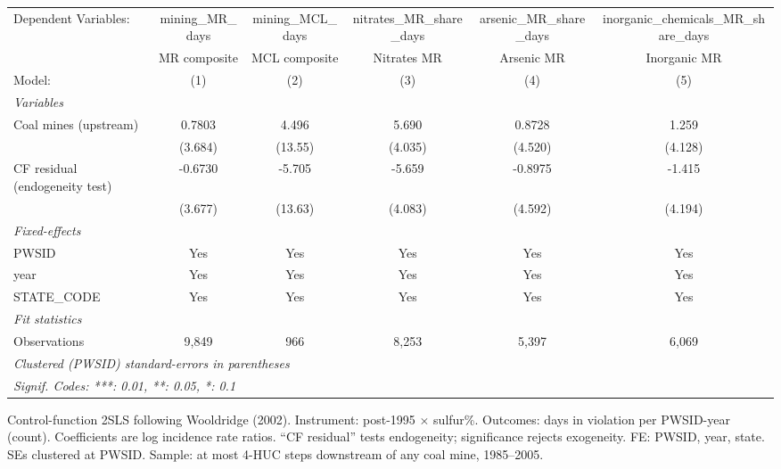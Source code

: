 
\begingroup
\centering
\begin{tabular}{lccccc}
   \tabularnewline \midrule \midrule
   Dependent Variables:           & mining\_MR\_days   & mining\_MCL\_days   & nitrates\_MR\_share\_days    & arsenic\_MR\_share\_days    & inorganic\_chemicals\_MR\_share\_days\\      
                                  & MR composite       & MCL composite       & Nitrates MR                  & Arsenic MR                  & Inorganic MR \\   
   Model:                         & (1)                & (2)                 & (3)                          & (4)                         & (5)\\  
   \midrule
   \emph{Variables}\\
   Coal mines (upstream)          & 0.7803             & 4.496               & 5.690                        & 0.8728                      & 1.259\\   
                                  & (3.684)            & (13.55)             & (4.035)                      & (4.520)                     & (4.128)\\   
   CF residual (endogeneity test) & -0.6730            & -5.705              & -5.659                       & -0.8975                     & -1.415\\   
                                  & (3.677)            & (13.63)             & (4.083)                      & (4.592)                     & (4.194)\\   
   \midrule
   \emph{Fixed-effects}\\
   PWSID                          & Yes                & Yes                 & Yes                          & Yes                         & Yes\\  
   year                           & Yes                & Yes                 & Yes                          & Yes                         & Yes\\  
   STATE\_CODE                    & Yes                & Yes                 & Yes                          & Yes                         & Yes\\  
   \midrule
   \emph{Fit statistics}\\
   Observations                   & 9,849              & 966                 & 8,253                        & 5,397                       & 6,069\\  
   \midrule \midrule
   \multicolumn{6}{l}{\emph{Clustered (PWSID) standard-errors in parentheses}}\\
   \multicolumn{6}{l}{\emph{Signif. Codes: ***: 0.01, **: 0.05, *: 0.1}}\\
\end{tabular}
 
\par \raggedright 
Control-function 2SLS following Wooldridge (2002). Instrument: post-1995 $\times$ sulfur\%. Outcomes: days in violation per PWSID-year (count). Coefficients are log incidence rate ratios. ``CF residual'' tests endogeneity; significance rejects exogeneity. FE: PWSID, year, state. SEs clustered at PWSID. Sample: at most 4-HUC steps downstream of any coal mine, 1985--2005.
\par\endgroup


